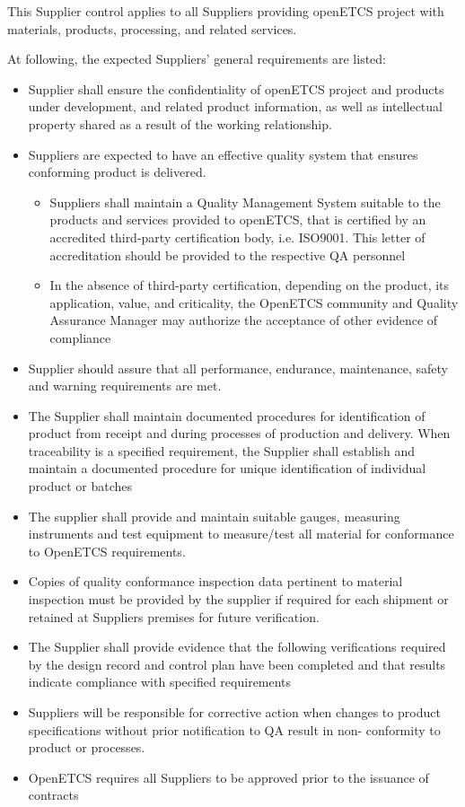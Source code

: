 \documentclass{template/openetcs_article}
\begin{document}
This Supplier control applies to all Suppliers providing openETCS project with materials, products, processing, and related services.

At following, the expected Suppliers' general requirements are listed:

\begin{itemize}
\item Supplier shall ensure the confidentiality of openETCS project and products under development, and related product information, as well as \gls{intellectual property} shared as a result of the working relationship.
\item Suppliers are expected to have an effective quality system that ensures conforming product is delivered.
\begin{itemize}
\item Suppliers shall maintain a Quality Management System suitable to the products and services provided to openETCS, that is certified by an accredited third-party certification body, i.e. ISO9001. This letter of accreditation should be provided to the respective QA personnel
\item In the absence of third-party certification, depending on the product, its application, value, and criticality, the OpenETCS community and Quality Assurance Manager may authorize the acceptance of other evidence of compliance
\end{itemize}
\item Supplier should assure that all performance, endurance, maintenance, safety and warning requirements are met.
\item The Supplier shall maintain documented procedures for identification of product from receipt and during processes of production and delivery. When traceability is a specified requirement, the Supplier shall establish and maintain a documented procedure for unique identification of individual product or batches
\item The supplier shall provide and maintain suitable gauges, measuring instruments and test equipment to measure/test all material for conformance to OpenETCS requirements.
\item Copies of quality conformance inspection data pertinent to material inspection must be provided by the supplier if required for each shipment or retained at Suppliers premises for future verification.
\item The Supplier shall provide evidence that the following verifications required by the design record and control plan have been completed and that results indicate compliance with specified requirements
\item Suppliers will be responsible for corrective action when changes to product specifications without prior notification to QA result in non- conformity to product or processes.
\item OpenETCS requires all Suppliers to be approved prior to the issuance of contracts
\end{itemize}
\end{document}
